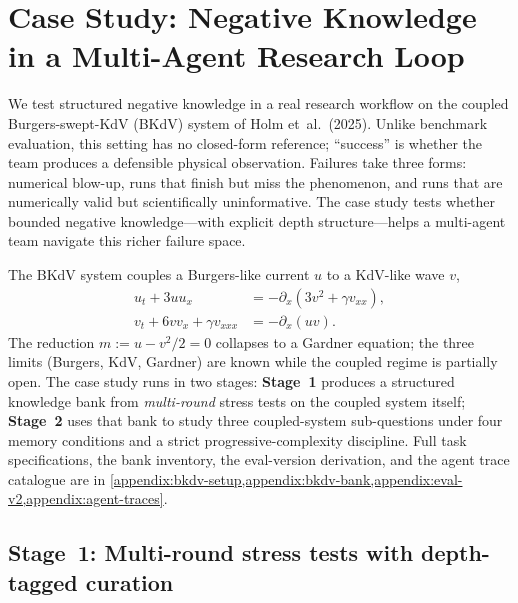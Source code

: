 
\section{Case Study: Negative Knowledge in a Multi-Agent Research Loop}
\label{sec:case-study}

We test structured negative knowledge in a real research workflow on the
coupled Burgers-swept-KdV (BKdV) system of Holm et~al.\ (2025). Unlike
benchmark evaluation, this setting has no closed-form reference; ``success''
is whether the team produces a defensible physical observation. Failures
take three forms: numerical blow-up, runs that finish but miss the phenomenon,
and runs that are numerically valid but scientifically uninformative. The
case study tests whether bounded negative knowledge---with explicit depth
structure---helps a multi-agent team navigate this richer failure space.

The BKdV system couples a Burgers-like current $u$ to a KdV-like wave $v$,
\begin{align*}
  u_t + 3 u u_x &= -\partial_x\!\left(3 v^2 + \gamma v_{xx}\right), \\
  v_t + 6 v v_x + \gamma v_{xxx} &= -\partial_x(u v).
\end{align*}
The reduction $m := u - v^2/2 = 0$ collapses to a Gardner equation; the three
limits (Burgers, KdV, Gardner) are known while the coupled regime is partially
open. The case study runs in two stages: \textbf{Stage~1} produces a structured
knowledge bank from \emph{multi-round} stress tests on the coupled system
itself; \textbf{Stage~2} uses that bank to study three coupled-system
sub-questions under four memory conditions and a strict
progressive-complexity discipline. Full task specifications, the
bank inventory, the eval-version derivation, and the agent trace catalogue
are in
\cref{appendix:bkdv-setup,appendix:bkdv-bank,appendix:eval-v2,appendix:agent-traces}.

\subsection{Stage~1: Multi-round stress tests with depth-tagged curation}
\label{sec:pde-stage1}

